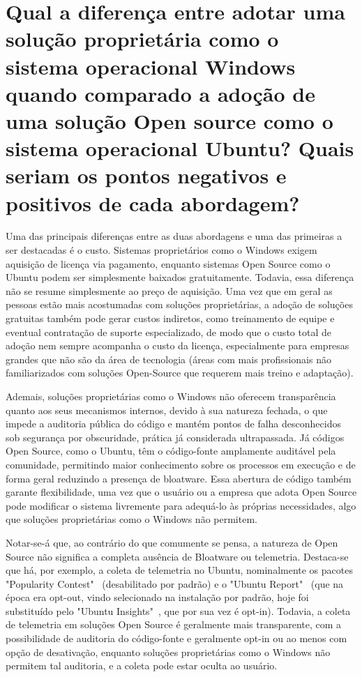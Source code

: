 \section{Qual a diferença entre adotar uma solução proprietária como o sistema operacional Windows quando comparado a adoção de uma solução Open source como o sistema operacional Ubuntu? Quais seriam os pontos negativos e positivos de cada abordagem?}

Uma das principais diferenças entre as duas abordagens e uma das primeiras a ser destacadas é o custo. Sistemas proprietários como o Windows exigem aquisição de licença via pagamento, enquanto sistemas Open Source como o Ubuntu podem ser simplesmente baixados gratuitamente. Todavia, essa diferença não se resume simplesmente ao preço de aquisição. Uma vez que em geral as pessoas estão mais acostumadas com soluções proprietárias, a adoção de soluções gratuitas também pode gerar custos indiretos, como treinamento de equipe e eventual contratação de suporte especializado, de modo que o custo total de adoção nem sempre acompanha o custo da licença, especialmente para empresas grandes que não são da área de tecnologia (áreas com mais profissionais não familiarizados com soluções Open-Source que requerem mais treino e adaptação).

Ademais, soluções proprietárias como o Windows não oferecem transparência quanto aos seus mecanismos internos, devido à sua natureza fechada, o que impede a auditoria pública do código e mantém pontos de falha desconhecidos sob segurança por obscuridade, prática já considerada ultrapassada. Já códigos Open Source, como o Ubuntu, têm o código-fonte amplamente auditável pela comunidade, permitindo maior conhecimento sobre os processos em execução e de forma geral reduzindo a presença de bloatware. Essa abertura de código também garante flexibilidade, uma vez que o usuário ou a empresa que adota Open Source pode modificar o sistema livremente para adequá-lo às próprias necessidades, algo que soluções proprietárias como o Windows não permitem.

Notar-se-á que, ao contrário do que comumente se pensa, a natureza de Open Source não significa a completa ausência de Bloatware ou telemetria. Destaca-se que há, por exemplo, a coleta de telemetria no Ubuntu, nominalmente os pacotes "Popularity Contest"~\cite{popularityContest} (desabilitado por padrão) e o "Ubuntu Report"~\cite{ubuntuReport} (que na época era opt-out, vindo selecionado na instalação por padrão, hoje foi substituído pelo "Ubuntu Insights"~\cite{ubuntuInsights}, que por sua vez é opt-in). Todavia, a coleta de telemetria em soluções Open Source é geralmente mais transparente, com a possibilidade de auditoria do código-fonte e geralmente opt-in ou ao menos com opção de desativação, enquanto soluções proprietárias como o Windows não permitem tal auditoria, e a coleta pode estar oculta ao usuário.

